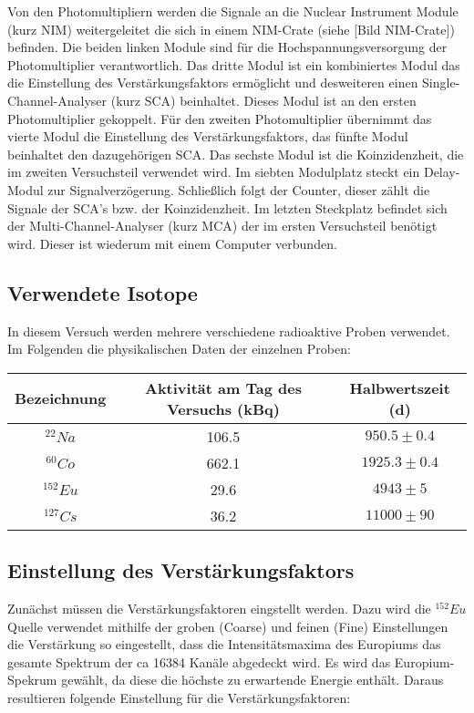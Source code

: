 \documentclass{../Misc/MontavonLaTeX/Montavon}
\begin{document}
Von den Photomultipliern werden die Signale an die Nuclear Instrument Module (kurz NIM) weitergeleitet die sich in einem NIM-Crate (siehe [Bild NIM-Crate]) befinden. Die beiden linken Module sind für die Hochspannungsversorgung der Photomultiplier verantwortlich. Das dritte Modul ist ein kombiniertes Modul das die Einstellung des Verstärkungsfaktors ermöglicht und desweiteren einen Single-Channel-Analyser (kurz SCA) beinhaltet. Dieses Modul ist an den ersten Photomultiplier gekoppelt. Für den zweiten Photomultiplier übernimmt das vierte Modul die Einstellung des Verstärkungsfaktors, das fünfte Modul beinhaltet den dazugehörigen SCA. Das sechste Modul ist die Koinzidenzheit, die im zweiten Versuchsteil verwendet wird. Im siebten Modulplatz steckt ein Delay-Modul zur Signalverzögerung. Schließlich folgt der Counter, dieser zählt die Signale der SCA's bzw. der Koinzidenzheit. Im letzten Steckplatz befindet sich der Multi-Channel-Analyser (kurz MCA) der im ersten Versuchsteil benötigt wird. Dieser ist wiederum mit einem Computer verbunden. 


\subsection{Verwendete Isotope}
In diesem Versuch werden mehrere verschiedene radioaktive Proben verwendet. Im Folgenden die physikalischen Daten der einzelnen Proben:

\begin{tabular}{|c|c|c|}
\hline 
Bezeichnung & Aktivität am Tag des Versuchs (kBq) &  Halbwertszeit (d)\tabularnewline
\hline 
$^{22}Na$ &  106.5 & $950.5\pm0.4$\tabularnewline
\hline 
$^{60}Co$ & 662.1 & $1925.3\pm0.4$\tabularnewline
\hline 
$^{152}Eu$ &  29.6 & $4943\pm5$\tabularnewline
\hline 
$^{127}Cs$ &  36.2 & $11000\pm90$\tabularnewline
\hline 
\end{tabular}

\subsection{Einstellung des Verstärkungsfaktors}
Zunächst müssen die Verstärkungsfaktoren eingstellt werden. Dazu wird die $^{152}Eu$ Quelle verwendet mithilfe der groben (Coarse) und feinen (Fine) Einstellungen die Verstärkung so eingestellt, dass die Intensitätsmaxima des Europiums das gesamte Spektrum der ca 16384 Kanäle abgedeckt wird. Es wird das Europium-Spekrum gewählt, da diese die höchste zu erwartende Energie enthält. Daraus resultieren folgende Einstellung für die Verstärkungsfaktoren:
\end{document}
